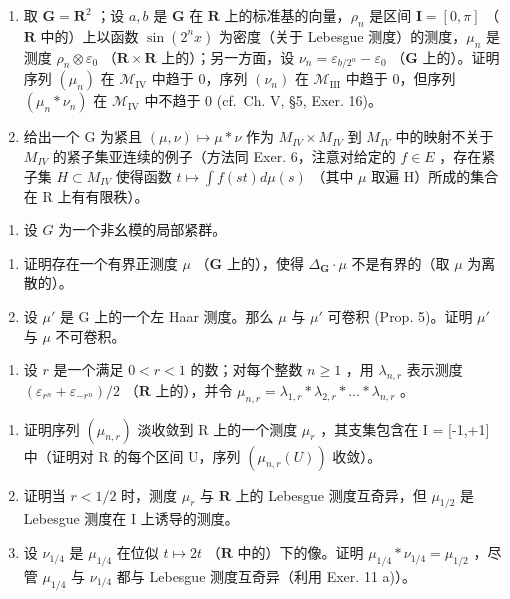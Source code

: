 \begin{enumerate}
\item
  取 \(\mathbf{G} = \mathbf{R}^2\) ；设 \(a, b\) 是 \(\mathbf{G}\) 在 \(\mathbf{R}\) 上的标准基的向量，\(\rho_n\) 是区间 \(\mathbf{I} = [0, \pi]\) （\(\mathbf{R}\) 中的）上以函数 \(\sin(2^n x)\) 为密度（关于 Lebesgue 测度）的测度，\(\mu_n\) 是测度 \(\rho_n \otimes \varepsilon_0\) （\(\mathbf{R} \times \mathbf{R}\) 上的）；另一方面，设 \(\nu_n = \varepsilon_{b/2^n} - \varepsilon_0\) （\(\mathbf{G}\) 上的）。证明序列 \((\mu_n)\) 在 \(\mathcal{M}_{\mathrm{IV}}\) 中趋于 0，序列 \((\nu_n)\) 在 \(\mathcal{M}_{\mathrm{III}}\) 中趋于 0，但序列 \((\mu_n * \nu_n)\) 在 \(\mathcal{M}_{\mathrm{IV}}\) 中不趋于 0 (cf.~Ch. V, §5, Exer. 16)。
\item
  给出一个 G 为紧且 \((\mu,\nu)\mapsto\mu*\nu\) 作为 \(M_{IV}\times M_{IV}\) 到 \(M_{IV}\) 中的映射不关于 \(M_{IV}\) 的紧子集亚连续的例子（方法同 Exer. 6，注意对给定的 \(f\in E\) ，存在紧子集 \(H\subset M_{IV}\) 使得函数 \(t\mapsto\int f(st)d\mu(s)\) （其中 \(\mu\) 取遍 H）所成的集合在 R 上有有限秩）。
\end{enumerate}

\begin{enumerate}
\def\labelenumi{\arabic{enumi})}
\setcounter{enumi}{11}
\tightlist
\item
  设 \(G\) 为一个非幺模的局部紧群。
\end{enumerate}

\begin{enumerate}
\def\labelenumi{\alph{enumi})}
\item
  证明存在一个有界正测度 \(\mu\) （\(\mathbf{G}\) 上的），使得 \(\Delta_{\mathbf{G}} \cdot \mu\) 不是有界的（取 \(\mu\) 为离散的）。
\item
  设 \(\mu'\) 是 G 上的一个左 Haar 测度。那么 \(\mu\) 与 \(\mu'\) 可卷积 (Prop. 5)。证明 \(\mu'\) 与 \(\mu\) 不可卷积。
\end{enumerate}

\begin{enumerate}
\def\labelenumi{\arabic{enumi})}
\setcounter{enumi}{12}
\tightlist
\item
  设 \(r\) 是一个满足 \(0 < r < 1\) 的数；对每个整数 \(n \geqslant 1\) ，用 \(\lambda_{n,r}\) 表示测度 \((\varepsilon_{r^n} + \varepsilon_{-r^n}) / 2\) （\(\mathbf{R}\) 上的），并令 \(\mu_{n,r} = \lambda_{1,r} * \lambda_{2,r} * \dots * \lambda_{n,r}\) 。
\end{enumerate}

\begin{enumerate}
\def\labelenumi{\alph{enumi})}
\item
  证明序列 \((\mu_{n,r})\) 淡收敛到 R 上的一个测度 \(\mu_{r}\) ，其支集包含在 I = {[}-1,+1{]} 中（证明对 R 的每个区间 U，序列 \((\mu_{n,r}(U))\) 收敛）。
\item
  证明当 \(r < 1/2\) 时，测度 \(\mu_r\) 与 \(\mathbf{R}\) 上的 Lebesgue 测度互奇异，但 \(\mu_{1/2}\) 是 Lebesgue 测度在 I 上诱导的测度。
\item
  设 \(\nu_{1/4}\) 是 \(\mu_{1/4}\) 在位似 \(t \mapsto 2t\) （\(\mathbf{R}\) 中的）下的像。证明 \(\mu_{1/4} * \nu_{1/4} = \mu_{1/2}\) ，尽管 \(\mu_{1/4}\) 与 \(\nu_{1/4}\) 都与 Lebesgue 测度互奇异（利用 Exer. 11 a)）。
\end{enumerate}

